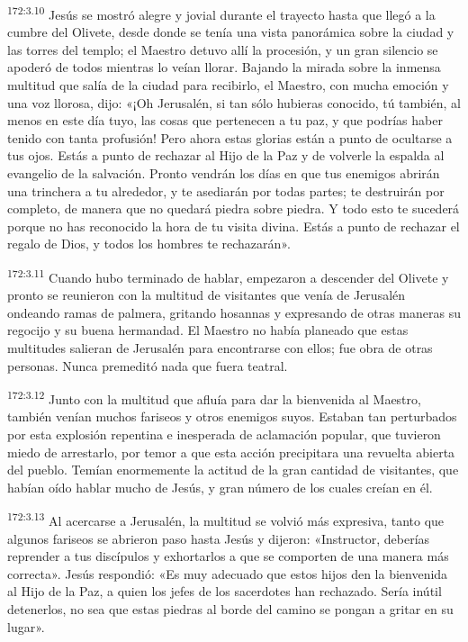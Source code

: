 \par 
\textsuperscript{172:3.10} Jesús se mostró alegre y jovial durante el trayecto hasta que llegó a la cumbre del Olivete, desde donde se tenía una vista panorámica sobre la ciudad y las torres del templo; el Maestro detuvo allí la procesión, y un gran silencio se apoderó de todos mientras lo veían llorar. Bajando la mirada sobre la inmensa multitud que salía de la ciudad para recibirlo, el Maestro, con mucha emoción y una voz llorosa, dijo: «¡Oh Jerusalén, si tan sólo hubieras conocido, tú también, al menos en este día tuyo, las cosas que pertenecen a tu paz, y que podrías haber tenido con tanta profusión! Pero ahora estas glorias están a punto de ocultarse a tus ojos. Estás a punto de rechazar al Hijo de la Paz y de volverle la espalda al evangelio de la salvación. Pronto vendrán los días en que tus enemigos abrirán una trinchera a tu alrededor, y te asediarán por todas partes; te destruirán por completo, de manera que no quedará piedra sobre piedra. Y todo esto te sucederá porque no has reconocido la hora de tu visita divina. Estás a punto de rechazar el regalo de Dios, y todos los hombres te rechazarán».

\par 
\textsuperscript{172:3.11} Cuando hubo terminado de hablar, empezaron a descender del Olivete y pronto se reunieron con la multitud de visitantes que venía de Jerusalén ondeando ramas de palmera, gritando hosannas y expresando de otras maneras su regocijo y su buena hermandad. El Maestro no había planeado que estas multitudes salieran de Jerusalén para encontrarse con ellos; fue obra de otras personas. Nunca premeditó nada que fuera teatral.

\par 
\textsuperscript{172:3.12} Junto con la multitud que afluía para dar la bienvenida al Maestro, también venían muchos fariseos y otros enemigos suyos. Estaban tan perturbados por esta explosión repentina e inesperada de aclamación popular, que tuvieron miedo de arrestarlo, por temor a que esta acción precipitara una revuelta abierta del pueblo. Temían enormemente la actitud de la gran cantidad de visitantes, que habían oído hablar mucho de Jesús, y gran número de los cuales creían en él.

\par 
\textsuperscript{172:3.13} Al acercarse a Jerusalén, la multitud se volvió más expresiva, tanto que algunos fariseos se abrieron paso hasta Jesús y dijeron: «Instructor, deberías reprender a tus discípulos y exhortarlos a que se comporten de una manera más correcta». Jesús respondió: «Es muy adecuado que estos hijos den la bienvenida al Hijo de la Paz, a quien los jefes de los sacerdotes han rechazado. Sería inútil detenerlos, no sea que estas piedras al borde del camino se pongan a gritar en su lugar».

